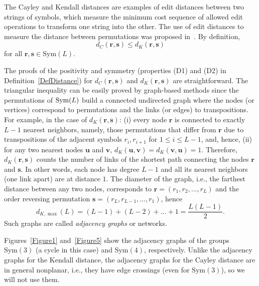 \documentclass{article}
\begin{document}
The Cayley and Kendall distances are examples of edit distances between two strings of symbols, which measure the minimum cost sequence of allowed edit operations to transform one string into the other. The use of edit distances to measure the distance between permutations was proposed in~\cite{Sorensen2007}. By definition,
\begin{equation}
d_{C}(\mathbf{r},\mathbf{s})\leq d_{K}(\mathbf{r},\mathbf{s})
\label{d_C <= d_K}
\end{equation}%
for all $\mathbf{r},\mathbf{s}\in \mathrm{Sym}(L)$.

The proofs of the positivity and symmetry (properties (D1) and (D2) in Definition~\ref{DefDistance}) for $d_{C}(\mathbf{r},\mathbf{s})$ and $d_{K}(%
\mathbf{r},\mathbf{s})$ are straightforward. The triangular inequality can
be easily proved by graph-based methods since the permutations of $\mathrm{%
Sym}(L)$ build a connected undirected graph where the nodes (or vertices) correspond to
permutations and the links (or edges) to transpositions. For example, in the case of $%
d_{K}(\mathbf{r},\mathbf{s})$: (i) every node $\mathbf{r}$ is connected to
exactly $L-1$ nearest neighbors, namely, those permutations that differ from 
$\mathbf{r}$ due to transpositions of the adjacent symbols $r_{i},r_{i+1}$
for $1\leq i\leq L-1$, and, hence, (ii) for any two nearest nodes $\mathbf{u}
$ and $\mathbf{v}$, $d_{K}(\mathbf{u},\mathbf{v})=d_{K}(\mathbf{v},\mathbf{u}%
)=1$. Therefore, $d_{K}(\mathbf{r},\mathbf{s})$ counts the number of links
of the shortest path connecting the nodes $\mathbf{r}$ and $\mathbf{s}$. In
other words, each node has degree $L-1$ and all its nearest neighbors (one
link apart) are at distance $1$. The diameter of the graph, i.e., the
farthest distance between any two nodes, corresponds to $\mathbf{r}%
=(r_{1},r_{2},\ldots,r_{L})$ and the order reversing permutation $\mathbf{s}%
=(r_{L},r_{L-1},\ldots,r_{1})$, hence%
\begin{equation}
d_{K,\max }(L)=(L-1)+(L-2)+\ldots+1=\frac{L(L-1)}{2}.  \label{Lmax}
\end{equation}%
Such graphs are called \textit{adjacency graphs} or networks.

Figures~\ref{Figure1} and~\ref{Figure5} show the adjacency graphs of the groups $%
\mathrm{Sym}(3)$ (a cycle in this case) and $\mathrm{Sym}(4)$, respectively.
Unlike the adjacency graphs for the Kendall distance, the adjacency graphs
for the Cayley distance are in general nonplanar, i.e., they have
edge crossings (even for $\mathrm{Sym}(3)$), so we will not use them.
\end{document}
